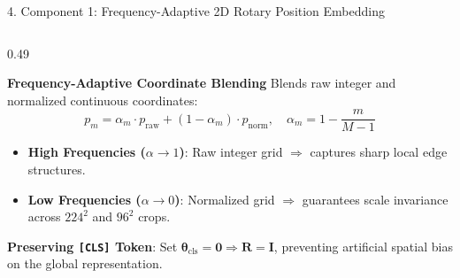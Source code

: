 \documentclass[aspectratio=169,10pt]{beamer}
\begin{document}
\begin{frame}{4. Component 1: Frequency-Adaptive 2D Rotary Position Embedding}
\begin{columns}[t]
    \begin{column}{0.49\textwidth}
        \begin{exampleblock}{\textbf{Frequency-Adaptive Coordinate Blending}}
            \small
            Blends raw integer and normalized continuous coordinates:
            \vspace{-0.3em}
            \[ p_m = \alpha_m \cdot p_{\text{raw}} + (1 - \alpha_m) \cdot p_{\text{norm}}, \quad \alpha_m = 1 - \frac{m}{M-1} \]
            \vspace{-0.3em}
            \begin{itemize}\setlength{\itemsep}{1.5pt}
                \item \textbf{High Frequencies ($\alpha \to 1$)}: Raw integer grid $\Rightarrow$ captures sharp local edge structures.
                \item \textbf{Low Frequencies ($\alpha \to 0$)}: Normalized grid $\Rightarrow$ guarantees scale invariance across $224^2$ and $96^2$ crops.
            \end{itemize}
            \textbf{Preserving \texttt{[CLS]} Token}: Set $\boldsymbol{\theta}_{\text{cls}} = \mathbf{0} \Rightarrow \mathbf{R} = \mathbf{I}$, preventing artificial spatial bias on the global representation.
        \end{exampleblock}
    \end{column}
\end{columns}
\end{frame}
\end{document}
